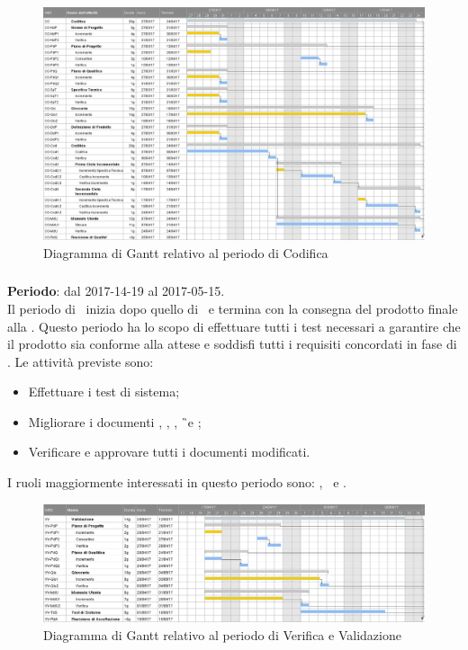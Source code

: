 		\begin{figure}[ht]
			\centering
			\includegraphics[scale=0.30]{img/ganttnetbreak4.png}
			\caption{Diagramma di Gantt relativo al periodo di Codifica}
		\end{figure}
		\FloatBarrier
		
		\subsubsection{\VV}
		\textbf{Periodo}: dal 2017-14-19 al 2017-05-15.\\
		Il periodo di \VV\ inizia dopo quello di \CO\ e termina con la consegna del prodotto finale alla \RA. Questo periodo ha lo scopo di effettuare tutti i test necessari a garantire che il prodotto sia conforme alla attese e soddisfi tutti i requisiti concordati in fase di \AdR. Le attività previste sono:
		\begin{itemize}
			\item Effettuare i test di sistema;
			\item Migliorare i documenti \NdP, \PdP, \PdQ, \G\ e \MU;
			\item Verificare e approvare tutti i documenti modificati.
		\end{itemize}
			I ruoli maggiormente interessati in questo periodo sono: \textit{\Res}, \textit{\Prog}\ e \textit{\Ver}.
			
		\begin{figure}[ht]
			\centering
			\includegraphics[scale=0.35]{img/ganttnetbreak5.png}
			\caption{Diagramma di Gantt relativo al periodo di Verifica e Validazione}
		\end{figure}
		\FloatBarrier
